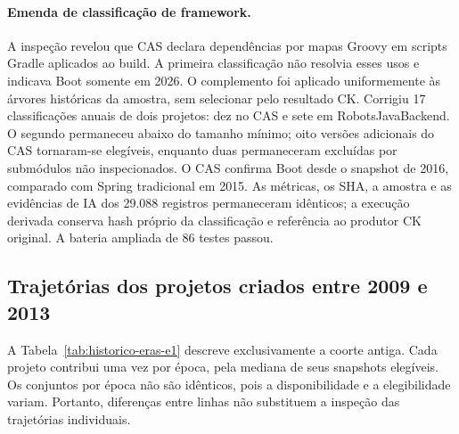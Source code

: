 \paragraph{Emenda de classificação de framework.}
A inspeção revelou que CAS declara dependências por mapas Groovy em scripts Gradle aplicados ao build. A primeira classificação não resolvia esses usos e indicava Boot somente em 2026. O complemento foi aplicado uniformemente às árvores históricas da amostra, sem selecionar pelo resultado CK. Corrigiu 17 classificações anuais de dois projetos: dez no CAS e sete em RobotsJavaBackend. O segundo permaneceu abaixo do tamanho mínimo; oito versões adicionais do CAS tornaram-se elegíveis, enquanto duas permaneceram excluídas por submódulos não inspecionados. O CAS confirma Boot desde o snapshot de 2016, comparado com Spring tradicional em 2015. As métricas, os SHA, a amostra e as evidências de IA dos 29.088 registros permaneceram idênticos; a execução derivada conserva hash próprio da classificação e referência ao produtor CK original. A bateria ampliada de 86 testes passou.

\subsection{Trajetórias dos projetos criados entre 2009 e 2013}
\label{subsec:trajetorias-antigas}

A Tabela~\ref{tab:historico-eras-e1} descreve exclusivamente a coorte antiga. Cada projeto contribui uma vez por época, pela mediana de seus snapshots elegíveis. Os conjuntos por época não são idênticos, pois a disponibilidade e a elegibilidade variam. Portanto, diferenças entre linhas não substituem a inspeção das trajetórias individuais.

\begin{table}[htbp]
\centering\scriptsize
\caption{Coorte antiga: medianas por época do código, com produção e testes.}
\label{tab:historico-eras-e1}
\end{table}

